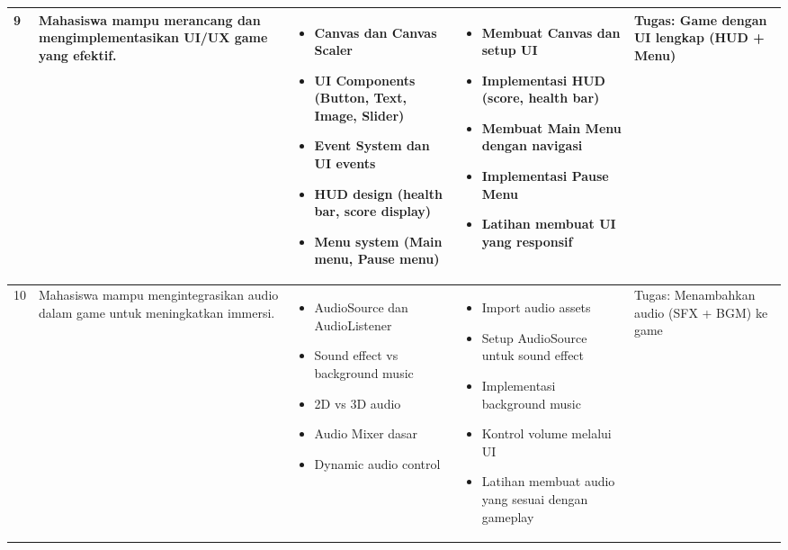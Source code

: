 \begin{longtable}{|p{0.8cm}|p{3.5cm}|p{4cm}|p{4cm}|p{2.5cm}|}
9 & Mahasiswa mampu merancang dan mengimplementasikan UI/UX game yang efektif. & 
\begin{itemize}[leftmargin=*,nosep]
\item Canvas dan Canvas Scaler
\item UI Components (Button, Text, Image, Slider)
\item Event System dan UI events
\item HUD design (health bar, score display)
\item Menu system (Main menu, Pause menu)
\end{itemize} & 
\begin{itemize}[leftmargin=*,nosep]
\item Membuat Canvas dan setup UI
\item Implementasi HUD (score, health bar)
\item Membuat Main Menu dengan navigasi
\item Implementasi Pause Menu
\item Latihan membuat UI yang responsif
\end{itemize} & 
Tugas: Game dengan UI lengkap (HUD + Menu) \\
\hline

10 & Mahasiswa mampu mengintegrasikan audio dalam game untuk meningkatkan immersi. & 
\begin{itemize}[leftmargin=*,nosep]
\item AudioSource dan AudioListener
\item Sound effect vs background music
\item 2D vs 3D audio
\item Audio Mixer dasar
\item Dynamic audio control
\end{itemize} & 
\begin{itemize}[leftmargin=*,nosep]
\item Import audio assets
\item Setup AudioSource untuk sound effect
\item Implementasi background music
\item Kontrol volume melalui UI
\item Latihan membuat audio yang sesuai dengan gameplay
\end{itemize} & 
Tugas: Menambahkan audio (SFX + BGM) ke game \\
\hline


\end{longtable}
